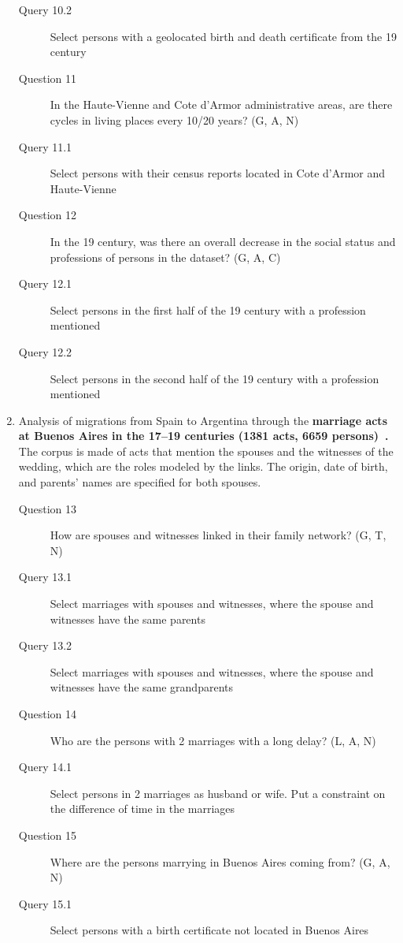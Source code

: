 \begin{enumerate}
\begin{footnotesize}
\begin{description}
    \item[\myindent Query 10.2] Select persons with a geolocated birth and death certificate from the 19 century
    \item[Question 11] In the Haute-Vienne and Cote d'Armor administrative areas, are there cycles in living places every 10/20 years? (G, A, N)
    \item[\myindent Query 11.1] Select persons with their census reports located in Cote d’Armor and Haute-Vienne
    \item[Question 12] In the 19 century, was there an overall decrease in the social status and professions of persons in the dataset? (G, A, C)
    \item[\myindent Query 12.1] Select persons in the first half of the 19 century with a profession mentioned
    \item[\myindent Query 12.2] Select persons in the second half of the 19 century with a profession mentioned
    \end{description}
    \end{footnotesize}
    \item Analysis of migrations from Spain to Argentina through the \textbf{marriage acts at Buenos Aires in the 17--19 centuries (1381 acts, 6659 persons)~\cite{moutoukiasBuenosAiresPort2016}.}
    The corpus is made of acts that mention the spouses and the witnesses of the wedding, which are the roles modeled by the links. The origin, date of birth, and parents' names are specified for both spouses.
    \begin{footnotesize}
    \begin{description}
    \item[Question 13] How are spouses and witnesses linked in their family network? (G, T, N)
    \item[\myindent Query 13.1] Select marriages with spouses and witnesses, where the spouse and witnesses have the same parents
    \item[\myindent Query 13.2] Select marriages with spouses and witnesses, where the spouse and witnesses have the same grandparents
    \item[Question 14] Who are the persons with 2 marriages with a long delay? (L, A, N)
    \item[\myindent Query 14.1] Select persons in 2 marriages as husband or wife. Put a constraint on the difference of time in the marriages
    \item[Question 15] Where are the persons marrying in Buenos Aires coming from? (G, A, N)
    \item[\myindent Query 15.1] Select persons with a birth certificate not located in Buenos Aires
    \end{description}
    \end{footnotesize}


\end{enumerate}

